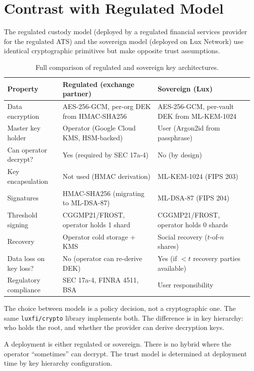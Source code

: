 \section{Contrast with Regulated Model}

\label{sec:contrast}

The regulated custody model (deployed by a regulated financial services provider for the regulated ATS)
and the sovereign model (deployed on Lux Network) use identical cryptographic
primitives but make opposite trust assumptions.

\begin{table}[h]
\centering
\small
\begin{tabular}{@{}p{3.2cm}p{5cm}p{5cm}@{}}
\toprule
\textbf{Property} & \textbf{Regulated (exchange partner)} & \textbf{Sovereign (Lux)} \\
\midrule
Data encryption &
  AES-256-GCM, per-org DEK from HMAC-SHA256 &
  AES-256-GCM, per-vault DEK from ML-KEM-1024 \\[4pt]
Master key holder &
  Operator (Google Cloud KMS, HSM-backed) &
  User (Argon2id from passphrase) \\[4pt]
Can operator decrypt? &
  Yes (required by SEC 17a-4) &
  No (by design) \\[4pt]
Key encapsulation &
  Not used (HMAC derivation) &
  ML-KEM-1024 (FIPS 203) \\[4pt]
Signatures &
  HMAC-SHA256 (migrating to ML-DSA-87) &
  ML-DSA-87 (FIPS 204) \\[4pt]
Threshold signing &
  CGGMP21/FROST, operator holds 1 shard &
  CGGMP21/FROST, operator holds 0 shards \\[4pt]
Recovery &
  Operator cold storage + KMS &
  Social recovery ($t$-of-$n$ shares) \\[4pt]
Data loss on key loss? &
  No (operator can re-derive DEK) &
  Yes (if $< t$ recovery parties available) \\[4pt]
Regulatory compliance &
  SEC 17a-4, FINRA 4511, BSA &
  User responsibility \\
\bottomrule
\end{tabular}
\caption{Full comparison of regulated and sovereign key architectures.}
\label{tab:full-comparison}
\end{table}

The choice between models is a policy decision, not a cryptographic one.
The same \texttt{luxfi/crypto} library implements both.  The difference
is in key hierarchy: who holds the root, and whether the provider can
derive decryption keys.

\begin{invariant}
A deployment is either regulated or sovereign.  There is no hybrid where
the operator ``sometimes'' can decrypt.  The trust model is determined at
deployment time by key hierarchy configuration.
\end{invariant}

